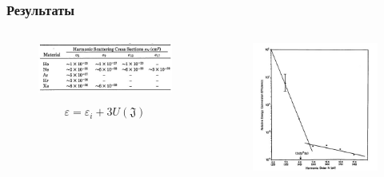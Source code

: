 \documentclass[handout]{beamer}
\newcommand{\inner}[1]{\left( #1 \right)}
\newcommand{\eps}{\varepsilon}
\begin{document}
\begin{frame}
    \frametitle{Результаты}
    \begin{columns}
        \begin{column}{0.5\textwidth}
            \begin{figure}[h]
                \centering
                \includegraphics[width=1\textwidth]{Mc/samp_n.jpg}
            \end{figure}
            \begin{equation}
                \eps = \eps_i + 3 U\inner{\mathfrak{J}}
            \end{equation}
        \end{column}

        \begin{column}{0.5\textwidth}
            \begin{figure}[h]
                \centering
                \includegraphics[width=1\textwidth]{Mc/n_I.jpg}
            \end{figure}
        \end{column}
      \end{columns}
\end{frame}
\end{document}
